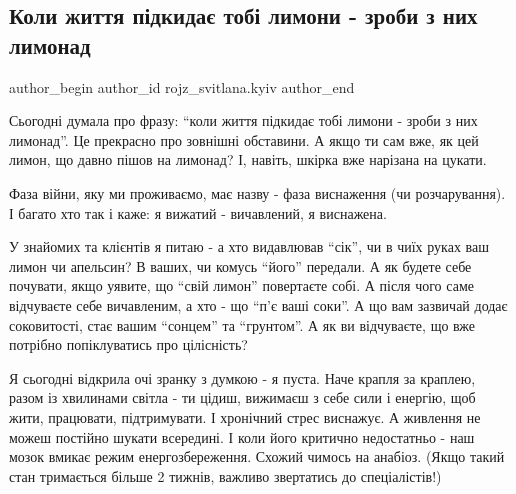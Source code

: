  
 
 
 
 
 
\subsection{Коли життя підкидає тобі лимони - зроби з них лимонад}
\label{sec:09_12_2022.fb.rojz_svitlana.kyiv.1.limony}
 
\ifcmt
 author_begin
   author_id rojz_svitlana.kyiv
 author_end
\fi

Сьогодні думала про фразу: \enquote{коли життя підкидає тобі лимони - зроби з них
лимонад}. Це прекрасно про зовнішні обставини. А якщо ти сам вже, як цей лимон,
що давно пішов на лимонад? І, навіть, шкірка вже нарізана на цукати.

Фаза війни, яку ми проживаємо, має назву - фаза виснаження (чи розчарування). І
багато хто так і каже: я вижатий - вичавлений, я виснажена.

У знайомих та клієнтів я питаю - а хто видавлював \enquote{сік}, чи в чиїх руках ваш
лимон чи апельсин? В ваших, чи комусь \enquote{його} передали. А як будете себе
почувати, якщо уявите, що \enquote{свій лимон} повертаєте собі. А після чого саме
відчуваєте себе вичавленим, а хто - що \enquote{п'є ваші соки}. А що вам зазвичай додає
соковитості, стає вашим \enquote{сонцем} та \enquote{грунтом}. А як ви відчуваєте, що вже
потрібно попіклуватись про цілісність?

Я сьогодні відкрила очі зранку з думкою - я пуста. Наче крапля за краплею,
разом із хвилинами світла - ти цідиш, вижимаєш з себе сили і енергію, щоб жити,
працювати, підтримувати. І хронічний стрес виснажує. А живлення не можеш
постійно шукати всередині. І коли його критично недостатньо - наш мозок вмикає
режим енергозбереження. Схожий чимось на анабіоз. (Якщо такий стан тримається
більше 2 тижнів, важливо звертатись до спеціалістів!)

